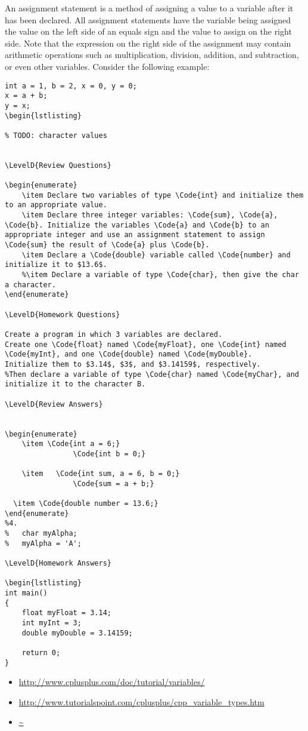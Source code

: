 
An assignment statement is a method of assigning a value to a variable after it has been declared.
All assignment statements have the variable being assigned the value on the left side of an equals sign and the value to assign on the right side.
Note that the expression on the right side of the assignment may contain arithmetic operations such as multiplication, division, addition, and subtraction, or even other variables.
Consider the following example:

\begin{lstlisting}
int a = 1, b = 2, x = 0, y = 0;
x = a + b;
y = x;
\begin{lstlisting}

% TODO: character values


\LevelD{Review Questions}

\begin{enumerate}
	\item Declare two variables of type \Code{int} and initialize them to an appropriate value.
	\item Declare three integer variables: \Code{sum}, \Code{a}, \Code{b}. Initialize the variables \Code{a} and \Code{b} to an appropriate integer and use an assignment statement to assign \Code{sum} the result of \Code{a} plus \Code{b}.
	\item Declare a \Code{double} variable called \Code{number} and initialize it to $13.6$.
	%\item Declare a variable of type \Code{char}, then give the char a character.
\end{enumerate}

\LevelD{Homework Questions}

Create a program in which 3 variables are declared.
Create one \Code{float} named \Code{myFloat}, one \Code{int} named \Code{myInt}, and one \Code{double} named \Code{myDouble}.
Initialize them to $3.14$, $3$, and $3.14159$, respectively. 
%Then declare a variable of type \Code{char} named \Code{myChar}, and initialize it to the character B. 

\LevelD{Review Answers}


\begin{enumerate}
	\item \Code{int a = 6;}
				\Code{int b = 0;}

	\item	\Code{int sum, a = 6, b = 0;}
				\Code{sum = a + b;}
 
  \item \Code{double number = 13.6;}
\end{enumerate}
%4. 
%	char myAlpha;
%	myAlpha = 'A';
	
\LevelD{Homework Answers}

\begin{lstlisting}
int main()
{
	float myFloat = 3.14;
	int myInt = 3;
	double myDouble = 3.14159;

	return 0;
}
\end{lstlisting}



\begin{itemize}
\item \url{http://www.cplusplus.com/doc/tutorial/variables/}
\item \url{http://www.tutorialspoint.com/cplusplus/cpp_variable_types.htm}
\item \url{~}
\end{itemize}	